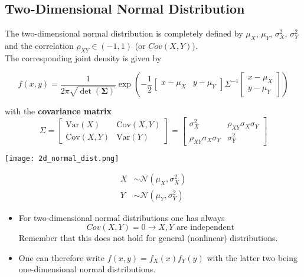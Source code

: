 \subsection{Two-Dimensional Normal Distribution}
The two-dimensional normal distribution is completely defined by $\mu_X$, $\mu_Y$, $\sigma_X^2$, $\sigma_Y^2$ and the correlation $\rho_{XY}\in(-1,1)$ (or $Cov(X,Y)$).\\
The corresponding joint density is given by
\begin{footnotesize}
    \begin{equation*}
        f(x,y) = \frac{1}{2\pi\sqrt{\det(\bm{\Sigma})}}\exp\left(-\frac{1}{2}\begin{bmatrix}x-\mu_X & y-\mu_Y\end{bmatrix}\Sigma^{-1}\begin{bmatrix}x-\mu_X \\ y-\mu_Y \end{bmatrix}\right)
    \end{equation*}
\end{footnotesize}
with the \textbf{covariance matrix}
\begin{equation*}
    \Sigma = \begin{bmatrix}
        \mathrm{Var}(X)   & \mathrm{Cov}(X,Y) \\
        \mathrm{Cov}(X,Y) & \mathrm{Var}(Y)
    \end{bmatrix}
    =
    \begin{bmatrix}
        \sigma_X^2                & \rho_{XY}\sigma_X\sigma_Y \\
        \rho_{XY}\sigma_X\sigma_Y & \sigma_Y^2
    \end{bmatrix}
\end{equation*}

\begin{center}
    \texttt{[image: 2d\_normal\_dist.png]}
\end{center}

\newpar{}
\begin{align*}
    X & \sim\mathcal{N}(\mu_X, \sigma_X^2) \\
    Y & \sim\mathcal{N}(\mu_Y, \sigma_Y^2)
\end{align*}


\begin{itemize}
    \item For two-dimensional normal distributions one has always 
    \begin{equation*}
        Cov(X,Y)=0 \rightarrow X, Y \text{ are independent}    
    \end{equation*}
    Remember that this does not hold for general (nonlinear) distributions.
    \item One can therefore write $f(x,y)=f_X(x)f_Y(y)$ with the latter two being one-dimensional normal distributions.
\end{itemize}


